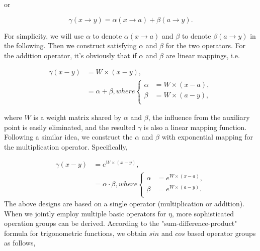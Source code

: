 \documentclass[journal]{IEEEtran}
\begin{document}
\noindent
or

\begin{equation}
\label{eq:addition}
    \gamma(x\to y)=\alpha(x\to a) + \beta(a\to y).
\end{equation}

\noindent
For simplicity, we will use $\alpha$ to denote $\alpha(x\to a)$ and $\beta$ to denote $\beta(a\to y)$ in the following. Then we construct satisfying $\alpha$ and $\beta$ for the two operators. For the addition operator, it's obviously that if $\alpha$ and $\beta$ are linear mappings, i.e. 


\begin{small}
\begin{equation}
\begin{aligned}
\gamma(x-y)&=W\times{(x-y)},\\&=\alpha + \beta
, where\left\{
\begin{aligned}
\label{eq:addbased}
    \alpha &= W\times (x-a),\\
    \beta &= W\times (a-y),\\
\end{aligned}
\right.
\end{aligned}
\end{equation}
\end{small}


\noindent
where $W$ is a weight matrix shared by $\alpha$ and $\beta$, the influence from the auxiliary point is easily eliminated, and the resulted $\gamma$ is also a linear mapping function. Following a similar idea, we construct the $\alpha$ and $\beta$ with exponential mapping for the multiplication operator. Specifically, 

\begin{equation}
\begin{aligned}
\gamma(x-y)&=e^{W\times(x-y)},\\&=\alpha\cdot\beta
, where\left\{
\begin{aligned}
\label{eq:multibased}
    \alpha &= e^{W\times(x-a)},\\
    \beta &= e^{W\times(a-y)}.\\
\end{aligned}
\right.
\end{aligned}
\end{equation}
The above designs are based on a single operator (multiplication or addition). When we jointly employ multiple basic operators for $\eta$, more sophisticated operation groups can be derived. According to the "sum-difference-product" formula for trigonometric functions, we obtain $sin$ and $cos$ based operator groups as follows,
\end{document}
